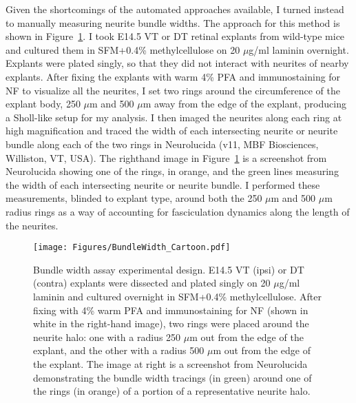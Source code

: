 Given the shortcomings of the automated approaches available, I turned instead to manually measuring neurite bundle widths.
The approach for this method is shown in Figure~\ref{Figures/BundleWidthCartoon}.
I took E14.5 VT or DT retinal explants from wild-type mice and cultured them in SFM+0.4\% methylcellulose on 20 $\mu$g/ml laminin overnight.
Explants were plated singly, so that they did not interact with neurites of nearby explants.
After fixing the explants with warm 4\% PFA and immunostaining for NF to visualize all the neurites, I set two rings around the circumference of the explant body, 250 $\mu$m and 500 $\mu$m away from the edge of the explant, producing a Sholl-like setup for my analysis.
I then imaged the neurites along each ring at high magnification and traced the width of each intersecting neurite or neurite bundle along each of the two rings in Neurolucida (v11, MBF Biosciences, Williston, VT, USA).
The righthand image in Figure~\ref{Figures/BundleWidthCartoon} is a screenshot from Neurolucida showing one of the rings, in orange, and the green lines measuring the width of each intersecting neurite or neurite bundle.
I performed these measurements, blinded to explant type, around both the 250 $\mu$m and 500 $\mu$m radius rings as a way of accounting for fasciculation dynamics along the length of the neurites.
\begin{figure}[hbtp]
    \begin{center}
        \texttt{[image: Figures/BundleWidth\_Cartoon.pdf]}
        \caption[Bundle width assay experimental design.]
        {Bundle width assay experimental design.
        E14.5 VT (ipsi) or DT (contra) explants were dissected and plated singly on 20 $\mu$g/ml laminin and cultured overnight in SFM+0.4\% methylcellulose.
        After fixing with 4\% warm PFA and immunostaining for NF (shown in white in the right-hand image), two rings were placed around the neurite halo: one with a radius 250 $\mu$m out from the edge of the explant, and the other with a radius 500 $\mu$m out from the edge of the explant.
        The image at right is a screenshot from Neurolucida demonstrating the bundle width tracings (in green) around one of the rings (in orange) of a portion of a representative neurite halo.
        }
        \label{Figures/BundleWidthCartoon}
    \end{center}
\end{figure}

